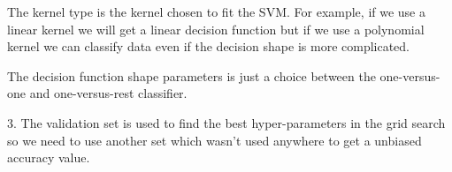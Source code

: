 The kernel type is the kernel chosen to fit the SVM. For example, if we use a linear kernel we will get a linear decision function but if we use a polynomial kernel we can classify data even if the decision shape is more complicated.

The decision function shape parameters is just a choice between the one-versus-one and one-versus-rest classifier.

3. The validation set is used to find the best hyper-parameters in the grid search so we need to use another set which wasn't used anywhere to get a unbiased accuracy value.